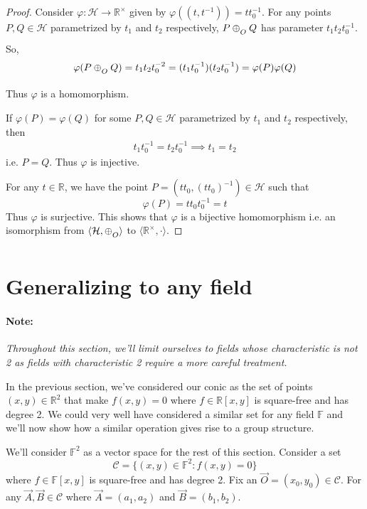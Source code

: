 \begin{proof}
    Consider $\varphi:\mathcal{H} \to \mathbb{R}^\times$ given by
    $\varphi((t,t^{-1})) = t t_0^{-1}$. For any points
    $P,Q\in\mathcal{H}$ parametrized by $t_1$ and $t_2$ respectively,
    $P \conop Q$ has parameter $t_1 t_2 t_0^{-1}$. So,
    \[
        \varphi(P \conop Q) = t_1 t_2 t_0^{-2} = (t_1 t_0^{-1}) (t_2 t_0^{-1})
        = \varphi(P) \varphi(Q)
    \]
    Thus $\varphi$ is a homomorphism.
    \vspace{1ex}

    \noindent
    If $\varphi(P)=\varphi(Q)$ for some $P,Q\in\mathcal{H}$ parametrized by $t_1$
    and $t_2$ respectively, then
    \begin{align*}
        t_1 t_0^{-1} = t_2 t_0^{-1} \implies t_1 = t_2
    \end{align*}
    i.e. $P=Q$. Thus $\varphi$ is injective.
    \vspace{1ex}

    \noindent
    For any $t \in \mathbb{R}$, we have the point
    $P=(t t_0,(t t_0)^{-1}) \in \mathcal{H}$ such that
    \[ \varphi(P) = t t_0 t_0^{-1} = t \]
    Thus $\varphi$ is surjective. This shows that $\varphi$ is a bijective
    homomorphism i.e. an isomorphism from $\langle \mathcal{H},\conop \rangle$ to
    $\langle \mathbb{R}^\times,\cdot \rangle$.
\end{proof}

\section{Generalizing to any field}

\paragraph{Note:} \emph{Throughout this section, we'll limit ourselves to fields
    whose characteristic is not 2 as fields with characteristic 2 require a more
    careful treatment.}
\vspace{1ex}

\noindent
In the previous section, we've considered our conic as the set of points
$(x,y)\in\mathbb{R}^2$ that make $f(x,y)=0$ where $f\in\mathbb{R}[x,y]$ is
square-free and has degree 2. We could very well have considered a similar set
for any field $\mathbb{F}$ and we'll
now show how a similar operation gives rise to a group structure.
\vspace{1ex}

\noindent
We'll consider $\mathbb{F}^2$ as a vector space for the rest of this section. 
Consider a set
\[ \mathcal{C} = \{(x,y)\in\mathbb{F}^2: f(x,y)=0\} \]
where $f\in\mathbb{F}[x,y]$ is square-free and has degree 2. Fix an
$\vec O=(x_0,y_0)\in\mathcal{C}$.  For any $\vec{A},\vec{B}\in\mathcal{C}$ where
$\vec{A}=(a_1,a_2)$ and $\vec{B}=(b_1,b_2)$.
\vspace{1ex}

